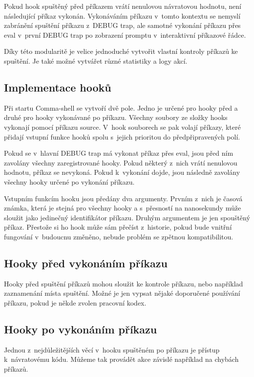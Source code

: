 \documentclass[thesis=M,czech]{FITthesis}[2012/06/26]
\begin{document}
Pokud hook spuštěný před příkazem vrátí nenulovou návratovou hodnotu, není následující příkaz vykonán. Vykonáváním příkazu v~tomto kontextu se nemyslí zabránění spuštění příkazu z~DEBUG trap, ale samotné vykonání příkazu přes eval v~první DEBUG trap po zobrazení promptu v~interaktivní příkazové řádce.

Díky této modularitě je velice jednoduché vytvořit vlastní kontroly příkazů ke spuštění. Je také možné vytvářet různé statistiky a logy akcí.


\subsection{Implementace hooků}

Při startu Comma-shell se vytvoří dvě pole. Jedno je určené pro hooky před a druhé pro hooky vykonávané po příkazu. Všechny soubory ze složky hooks vykonají pomocí příkazu source. V~hook souborech se pak volají příkazy, které přidají vstupní funkce hooků spolu s~jejich prioritou do předpřipravených polí.

Pokud se v~hlavní DEBUG trap má vykonat příkaz přes eval, jsou před ním zavolány všechny zaregistrované hooky. Pokud některý z~nich vrátí nenulovou hodnotu, příkaz se nevykoná. Pokud k~vykonání dojde, jsou následně zavolány všechny hooky určené po vykonání příkazu.

Vstupním funkcím hooku jsou předány dva argumenty. Prvním z~nich je časová známka, která je stejná pro všechny hooky a s~přesností na nanosekundy může sloužit jako jedinečný identifikátor příkazu. Druhým argumentem je jen spouštěný příkaz. Přestože si ho hook může sám přečíst z~historie, pokud bude vnitřní fungování v~budoucnu změněno, nebude problém se zpětnou kompatibilitou.

\subsection{Hooky před vykonáním příkazu}

Hooky před spuštění příkazů mohou sloužit ke kontrole příkazu, nebo například zaznamenání místa spuštění. Možné je jen vypsat nějaké doporučené používání příkazu, pokud je někde zvolen pracovní kodex.

\subsection{Hooky po vykonáním příkazu}

Jednou z~nejdůležitějších věcí v~hooku spuštěném po příkazu je přístup k~návratovému kódu. Můžeme tak provádět akce závislé například na chybách příkazů.
\end{document}
